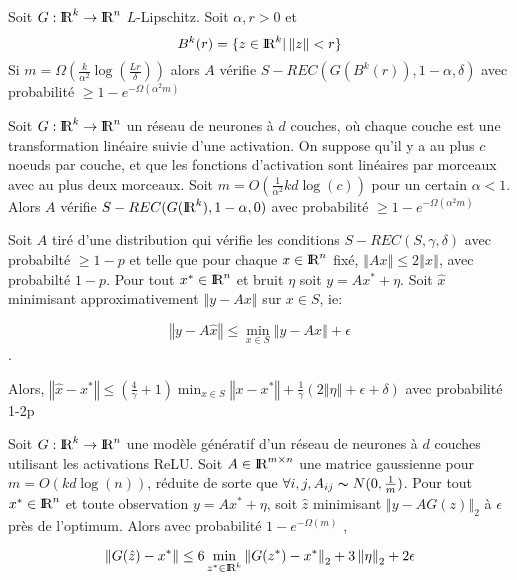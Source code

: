 \documentclass{beamer}
\def\R{\textrm{I\kern-0.21emR}}
\newcommand{\norm}[1]{\left\Vert #1\right\Vert}
\begin{document}
\begin{frame}{\secname}
    \begin{lemma}
Soit $G : \R^k \rightarrow \R^n$ $L$-Lipschitz. Soit $\alpha, r > 0$ et $$B^k(r) = \{ z \in \R^k | \norm{z} < r \}$$
Si $m = \Omega(\frac{k}{\alpha^2} \log(\frac{Lr}{\delta}))$ alors $A$ vérifie $S-REC(G(B^k(r)), 1-\alpha, \delta)$ avec probabilité  $ \geq 1 - e^{- \Omega(\alpha^2 m)}$  
\end{lemma}
\end{frame}

\begin{frame}{\secname}
    \begin{lemma}
Soit $G : \R^k \rightarrow \R^n$ un réseau de neurones à $d$ couches, où chaque couche est une transformation linéaire suivie d'une activation. On suppose qu'il y a au plus $c$ noeuds par couche, et que les fonctions d'activation sont linéaires par morceaux avec au plus deux morceaux. Soit $m = O(\frac{1}{\alpha^2} kd \log(c))$ pour un certain $\alpha <1$. Alors $A$ vérifie $S-REC(G(\R^k), 1-\alpha, 0)$ avec probabilité  $ \geq 1 - e^{- \Omega(\alpha^2 m)}$  

\end{lemma}
\end{frame}
\begin{frame}
\begin{lemma}
Soit $A$ tiré d'une distribution qui vérifie les conditions $S-REC(S,\gamma, \delta)$ avec probabilté $\geq 1-p$ et telle que pour chaque $x \in \R^n$ fixé, $\norm{Ax} \leq 2 \norm{x}$, avec probabilté $1-p$. Pour tout $x^* \in \R^n$ et bruit $\eta$ soit $y = Ax^* + \eta$. Soit $\hat{x}$ minimisant approximativement $\norm{y - Ax}$ sur $x \in S$, ie:

$$ \norm{y - A\hat{x} } \leq \min_{x  \in S} \norm{y - Ax} + \epsilon$$.

Alors, $\norm{\hat{x} - x^*} \leq (\frac{4}{\gamma} +1) \min_{x \in S} \norm{x - x^*} + \frac{1}{\gamma}(2\norm{\eta} + \epsilon + \delta)$ avec probabilité 1-2p
\end{lemma}
\end{frame}





\begin{frame}{\secname}
    \begin{theorem}
Soit $G : \R^k \rightarrow \R^n$ une modèle génératif d'un réseau de neurones à $d$ couches utilisant les activations ReLU. Soit $A \in \R^{m \times n}$ une matrice gaussienne pour $m = O(kd \log(n))$, réduite de sorte que $\forall i,j, A_{ij} \thicksim N(0, \frac{1}{m})$. Pour tout $x^* \in \R^n$ et toute observation $y = Ax^* + \eta$, soit $\hat{z}$ minimisant $\norm{y - AG(z)}_2$ à $\epsilon$ près de l'optimum. Alors avec probabilité $1-e^{-\Omega(m)}$ , 

$$ \norm{G(\hat{z}) - x^*} \leq 6 \min_{z^* \in \R^k} \norm{G(z^*) - x^*}_2 +3\norm{\eta}_2 + 2\epsilon$$
\end{theorem}
\end{frame}
\end{document}

